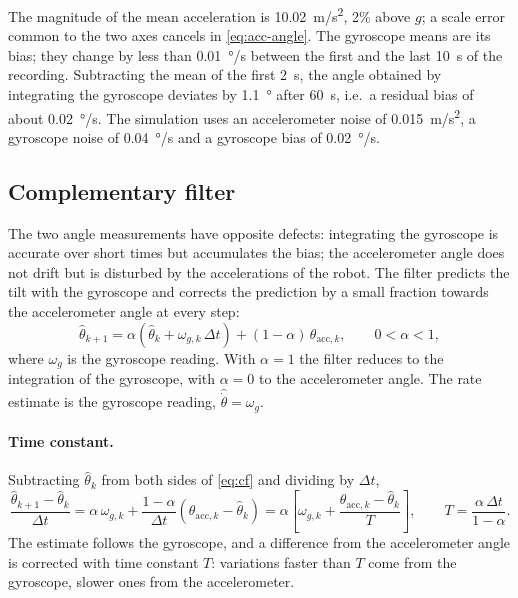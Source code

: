 The magnitude of the mean acceleration is \SI{10.02}{m/s^2}, 2\% above $g$; a
scale error common to the two axes cancels in \cref{eq:acc-angle}. The gyroscope
means are its bias; they change by less than \SI{0.01}{\degree/s} between the
first and the last \SI{10}{s} of the recording. Subtracting the mean of the
first \SI{2}{s}, the angle obtained by integrating the gyroscope deviates by
\SI{1.1}{\degree} after \SI{60}{s}, i.e.\ a residual bias of about
\SI{0.02}{\degree/s}. The simulation uses an accelerometer noise of
\SI{0.015}{m/s^2}, a gyroscope noise of \SI{0.04}{\degree/s} and a gyroscope
bias of \SI{0.02}{\degree/s}.

\subsection{Complementary filter}

The two angle measurements have opposite defects: integrating the gyroscope is
accurate over short times but accumulates the bias; the accelerometer angle
does not drift but is disturbed by the accelerations of the robot. The filter
predicts the tilt with the gyroscope and corrects the prediction by a small
fraction towards the accelerometer angle at every step:
\begin{equation}
  \hat\theta_{k+1} = \alpha\left(\hat\theta_k + \omega_{g,k}\,\Delta t\right)
                     + (1 - \alpha)\,\theta_{\mathrm{acc},k} ,
  \qquad 0 < \alpha < 1 ,
  \label{eq:cf}
\end{equation}
where $\omega_g$ is the gyroscope reading. With $\alpha = 1$ the filter reduces
to the integration of the gyroscope, with $\alpha = 0$ to the accelerometer
angle. The rate estimate is the gyroscope reading, $\hat{\dot\theta} = \omega_g$.

\paragraph{Time constant.} Subtracting $\hat\theta_k$ from both sides of
\cref{eq:cf} and dividing by $\Delta t$,
\begin{equation}
  \frac{\hat\theta_{k+1} - \hat\theta_k}{\Delta t}
  = \alpha\,\omega_{g,k} + \frac{1 - \alpha}{\Delta t}\left(\theta_{\mathrm{acc},k} - \hat\theta_k\right)
  = \alpha\left[\omega_{g,k} + \frac{\theta_{\mathrm{acc},k} - \hat\theta_k}{T}\right],
  \qquad T = \frac{\alpha\,\Delta t}{1 - \alpha} .
\end{equation}
The estimate follows the gyroscope, and a difference from the accelerometer
angle is corrected with time constant $T$: variations faster than $T$ come from
the gyroscope, slower ones from the accelerometer.


